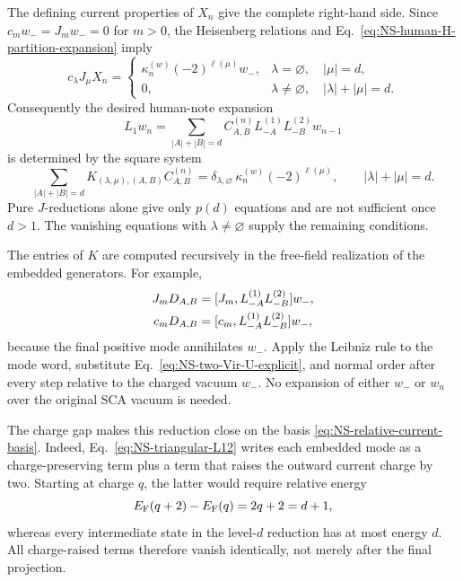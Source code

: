 \documentclass[11pt]{article}
\begin{document}
The defining current properties of \(X_n\) give the complete right-hand
side.  Since \(c_mw_-=J_mw_-=0\) for \(m>0\), the Heisenberg relations and
Eq.~\eqref{eq:NS-human-H-partition-expansion} imply
\begin{equation}
 \boxed{
 c_\lambda J_\mu X_n
 =\begin{cases}
   \kappa_n^{(w)}(-2)^{\ell(\mu)}w_-,
    &\lambda=\varnothing,\quad |\mu|=d,\\
   0,
    &\lambda\ne\varnothing,\quad |\lambda|+|\mu|=d.
  \end{cases}}
 \label{eq:NS-terminal-current-conditions}
\end{equation}
Consequently the desired human-note expansion
\begin{equation}
 L_1w_n
 =\sum_{|A|+|B|=d}C_{A,B}^{(n)}
 L_{-A}^{(1)}L_{-B}^{(2)}w_{n-1}
 \label{eq:NS-human-double-Vir-expansion}
\end{equation}
is determined by the square system
\begin{equation}
 \boxed{
 \sum_{|A|+|B|=d}
 K_{(\lambda,\mu),(A,B)}C_{A,B}^{(n)}
 =\delta_{\lambda,\varnothing}\,
  \kappa_n^{(w)}(-2)^{\ell(\mu)},
 \qquad |\lambda|+|\mu|=d.}
 \label{eq:NS-terminal-linear-system}
\end{equation}
Pure \(J\)-reductions alone give only \(p(d)\) equations and are not
sufficient once \(d>1\).  The vanishing equations with
\(\lambda\ne\varnothing\) supply the remaining conditions.

The entries of \(K\) are computed recursively in the free-field
realization of the embedded generators.  For example,
\begin{align}
 J_mD_{A,B}
 &=[J_m,L_{-A}^{(1)}L_{-B}^{(2)}]w_-,
 \notag\\
 c_mD_{A,B}
 &=[c_m,L_{-A}^{(1)}L_{-B}^{(2)}]w_-,
 \label{eq:NS-relative-positive-mode-reduction}
\end{align}
because the final positive mode annihilates \(w_-\).  Apply the Leibniz
rule to the mode word, substitute Eq.~\eqref{eq:NS-two-Vir-U-explicit}, and
normal order after every step relative to the charged vacuum \(w_-\).  No
expansion of either \(w_-\) or \(w_n\) over the original SCA vacuum is
needed.

The charge gap makes this reduction close on the basis
\eqref{eq:NS-relative-current-basis}.  Indeed,
Eq.~\eqref{eq:NS-triangular-L12} writes each embedded mode as a
charge-preserving term plus a term that raises the outward current charge
by two.  Starting at charge \(q\), the latter would require relative energy
\begin{equation}
 E_{\rm F}(q+2)-E_{\rm F}(q)=2q+2=d+1,
 \end{equation}
whereas every intermediate state in the level-\(d\) reduction has at most
energy \(d\).  All charge-raised terms therefore vanish identically, not
merely after the final projection.
\end{document}
